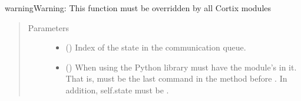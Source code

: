 \documentclass[letterpaper,10pt,openany,oneside,english]{sphinxmanual}
\begin{document}
\begin{fulllineitems}
\begin{fulllineitems}
\begin{sphinxadmonition}{warning}{Warning:}
This function must be overridden by all Cortix modules
\end{sphinxadmonition}
\begin{quote}\begin{description}
\item[{Parameters}] \leavevmode\begin{itemize}
\item {} 
\sphinxstyleliteralstrong{\sphinxupquote{{[}}}\sphinxstyleliteralstrong{\sphinxupquote{{]}}} () \textendash{} Index of the state in the communication queue.

\item {} 
\sphinxstyleliteralstrong{\sphinxupquote{{[}}}\sphinxstyleliteralstrong{\sphinxupquote{{]}}} () \textendash{} When using the Python  library  must have
the module’s  in it. That is,
 must be the last command in the
method before . In addition, self.state must be .

\end{itemize}

\end{description}\end{quote}

\end{fulllineitems}


\end{fulllineitems}
\end{document}
